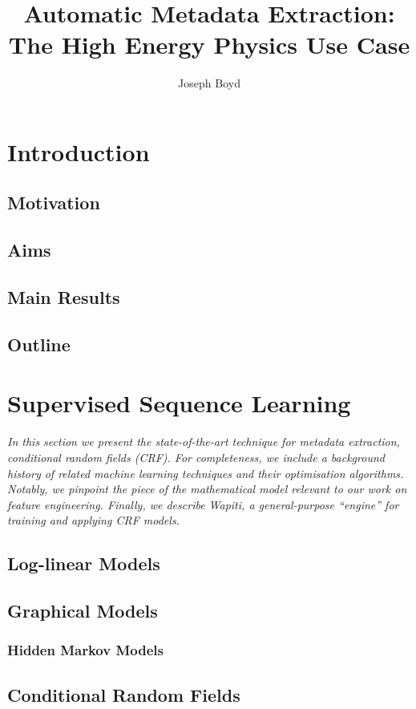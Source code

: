 \documentclass[10pt, oneside]{scrartcl}   	%
\title{Automatic Metadata Extraction: The High Energy Physics Use Case}
\author{Joseph Boyd}
\begin{document}
\maketitle

\tableofcontents

\section{Introduction} %

\subsection{Motivation}
\subsection{Aims}
\subsection{Main Results}
\subsection{Outline}
\section{Supervised Sequence Learning}
\emph{In this section we present the state-of-the-art technique for metadata extraction, conditional random fields (CRF). For completeness, we include a background history of related machine learning techniques and their optimisation algorithms. Notably, we pinpoint the piece of the mathematical model relevant to our work on feature engineering. Finally, we describe Wapiti, a general-purpose ``engine'' for training and applying CRF models.}
\subsection{Log-linear Models}
\subsection{Graphical Models}
\subsubsection{Hidden Markov Models}
\subsection{Conditional Random Fields}
\end{document}
